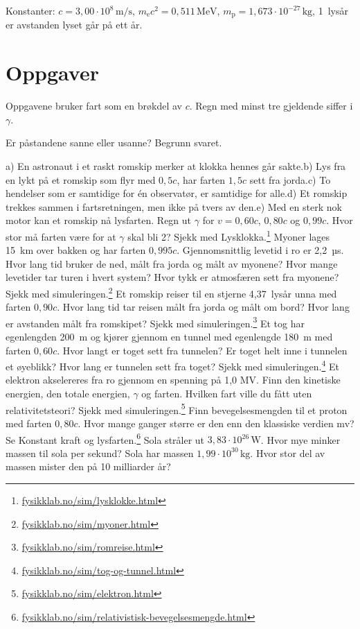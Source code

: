 \documentclass[11pt]{article}
\begin{document}
Konstanter: $c = 3{,}00 \cdot 10^{8}\,\mathrm{m/s}$, $m_{\mathrm{e}}c^{2} = 0{,}511\,\mathrm{MeV}$, $m_{\mathrm{p}} = 1{,}673 \cdot 10^{-27}\,\mathrm{kg}$, 1~lysår er avstanden lyset går på ett år.

\section*{Oppgaver}

Oppgavene bruker fart som en brøkdel av $c$. Regn med minst tre gjeldende siffer i $γ$.

\begin{oppgaveliste}
\oppgave {}Er påstandene sanne eller usanne? Begrunn svaret.

a) En astronaut i et raskt romskip merker at klokka hennes går sakte.\newline b) Lys fra en lykt på et romskip som flyr med $0{,}5c$, har farten $1{,}5c$ sett fra jorda.\newline c) To hendelser som er samtidige for én observatør, er samtidige for alle.\newline d) Et romskip trekkes sammen i fartsretningen, men ikke på tvers av den.\newline e) Med en sterk nok motor kan et romskip nå lysfarten.
\svar
\oppgave {}Regn ut $γ$ for $v = 0{,}60c$, $0{,}80c$ og $0{,}99c$. Hvor stor må farten være for at $γ$ skal bli 2? Sjekk med Lysklokka.\footnote{\url{fysikklab.no/sim/lysklokke.html}}
\svar
\oppgave {}Myoner lages 15~km over bakken og har farten $0{,}995c$. Gjennomsnittlig levetid i ro er 2,2~µs. Hvor lang tid bruker de ned, målt fra jorda og målt av myonene? Hvor mange levetider tar turen i hvert system? Hvor tykk er atmosfæren sett fra myonene? Sjekk med simuleringen.\footnote{\url{fysikklab.no/sim/myoner.html}}
\svar
\oppgave {}Et romskip reiser til en stjerne 4,37~lysår unna med farten $0{,}90c$. Hvor lang tid tar reisen målt fra jorda og målt om bord? Hvor lang er avstanden målt fra romskipet? Sjekk med simuleringen.\footnote{\url{fysikklab.no/sim/romreise.html}}
\svar
\oppgave {}Et tog har egenlengden 200~m og kjører gjennom en tunnel med egenlengde 180~m med farten $0{,}60c$. Hvor langt er toget sett fra tunnelen? Er toget helt inne i tunnelen et øyeblikk? Hvor lang er tunnelen sett fra toget? Sjekk med simuleringen.\footnote{\url{fysikklab.no/sim/tog-og-tunnel.html}}
\svar
\oppgave {}Et elektron akselereres fra ro gjennom en spenning på 1,0 MV. Finn den kinetiske energien, den totale energien, $γ$ og farten. Hvilken fart ville du fått uten relativitetsteori? Sjekk med simuleringen.\footnote{\url{fysikklab.no/sim/elektron.html}}
\svar
\oppgave {}Finn bevegelsesmengden til et proton med farten $0{,}80c$. Hvor mange ganger større er den enn den klassiske verdien mv? Se Konstant kraft og lysfarten.\footnote{\url{fysikklab.no/sim/relativistisk-bevegelsesmengde.html}}
\svar
\oppgave {}Sola stråler ut $3{,}83 \cdot 10^{26}\,\mathrm{W}$. Hvor mye minker massen til sola per sekund? Sola har massen $1{,}99 \cdot 10^{30}\,\mathrm{kg}$. Hvor stor del av massen mister den på 10 milliarder år?
\svar
\end{oppgaveliste}
\end{document}
